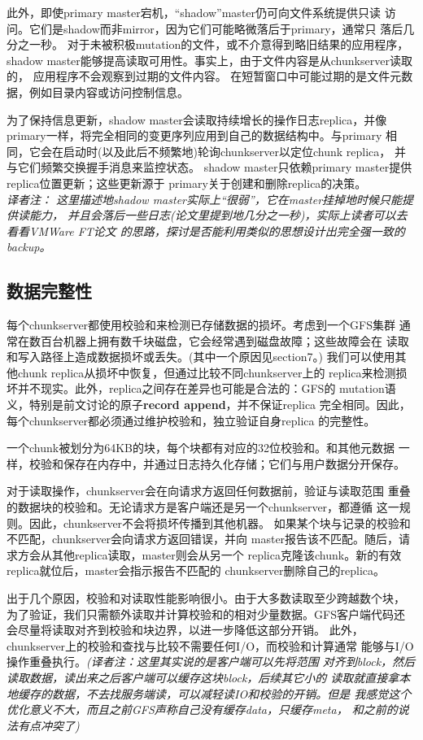 此外，即使primary master宕机，“shadow”master仍可向文件系统提供只读
访问。它们是shadow而非mirror，因为它们可能略微落后于primary，通常只
落后几分之一秒。
对于未被积极mutation的文件，或不介意得到略旧结果的应用程序，shadow
master能够提高读取可用性。事实上，由于文件内容是从chunkserver读取的，
应用程序不会观察到过期的文件内容。
在短暂窗口中可能过期的是文件元数据，例如目录内容或访问控制信息。

为了保持信息更新，shadow master会读取持续增长的操作日志replica，并像
primary一样，将完全相同的变更序列应用到自己的数据结构中。与primary
相同，它会在启动时(以及此后不频繁地)轮询chunkserver以定位chunk replica，
并与它们频繁交换握手消息来监控状态。
shadow master只依赖primary master提供replica位置更新；这些更新源于
primary关于创建和删除replica的决策。
\\\emph{译者注：
这里描述地shadow master实际上“很弱”，它在master挂掉地时候只能提供读能力，
并且会落后一些日志(论文里提到地几分之一秒)，实际上读者可以去看看VMWare FT论文
的思路，探讨是否能利用类似的思想设计出完全强一致的backup。}

\subsection{数据完整性}
每个chunkserver都使用校验和来检测已存储数据的损坏。考虑到一个GFS集群
通常在数百台机器上拥有数千块磁盘，它会经常遇到磁盘故障；这些故障会在
读取和写入路径上造成数据损坏或丢失。(其中一个原因见section7。)
我们可以使用其他chunk replica从损坏中恢复，但通过比较不同chunkserver上的
replica来检测损坏并不现实。此外，replica之间存在差异也可能是合法的：GFS的
mutation语义，特别是前文讨论的原子\textbf{record append}，并不保证replica
完全相同。因此，每个chunkserver都必须通过维护校验和，独立验证自身replica
的完整性。

一个chunk被划分为64KB的块，每个块都有对应的32位校验和。和其他元数据
一样，校验和保存在内存中，并通过日志持久化存储；它们与用户数据分开保存。

对于读取操作，chunkserver会在向请求方返回任何数据前，验证与读取范围
重叠的数据块的校验和。无论请求方是客户端还是另一个chunkserver，都遵循
这一规则。因此，chunkserver不会将损坏传播到其他机器。
如果某个块与记录的校验和不匹配，chunkserver会向请求方返回错误，并向
master报告该不匹配。随后，请求方会从其他replica读取，master则会从另一个
replica克隆该chunk。新的有效replica就位后，master会指示报告不匹配的
chunkserver删除自己的replica。

出于几个原因，校验和对读取性能影响很小。由于大多数读取至少跨越数个块，
为了验证，我们只需额外读取并计算校验和的相对少量数据。GFS客户端代码还
会尽量将读取对齐到校验和块边界，以进一步降低这部分开销。
此外，chunkserver上的校验和查找与比较不需要任何I/O，而校验和计算通常
能够与I/O操作重叠执行。\emph{(译者注：这里其实说的是客户端可以先将范围
对齐到block，然后读取数据，读出来之后客户端可以缓存这块block，后续其它小的
读取就直接拿本地缓存的数据，不去找服务端读，可以减轻读IO和校验的开销。但是
我感觉这个优化意义不大，而且之前GFS声称自己没有缓存data，只缓存meta，
和之前的说法有点冲突了)}

